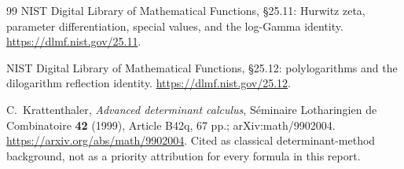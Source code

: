 \begin{thebibliography}{99}
NIST Digital Library of Mathematical Functions,
\S25.11: Hurwitz zeta, parameter differentiation, special values,
and the log-Gamma identity.
\url{https://dlmf.nist.gov/25.11}.

NIST Digital Library of Mathematical Functions,
\S25.12: polylogarithms and the dilogarithm reflection identity.
\url{https://dlmf.nist.gov/25.12}.

C.~Krattenthaler,
\emph{Advanced determinant calculus},
S\'eminaire Lotharingien de Combinatoire \textbf{42} (1999), Article B42q,
67 pp.; arXiv:math/9902004.
\url{https://arxiv.org/abs/math/9902004}.
Cited as classical determinant-method background, not as a priority
attribution for every formula in this report.

\end{thebibliography}
